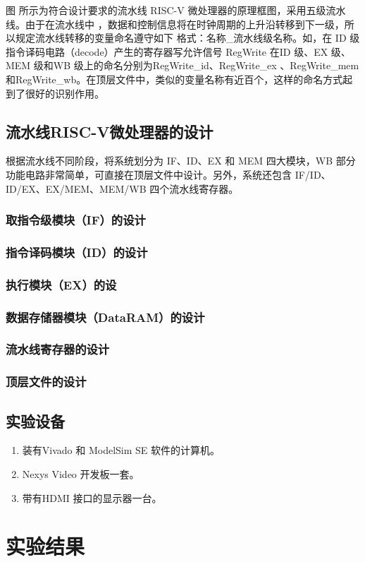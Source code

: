 \documentclass{../source/Experiment}
\begin{document}
        图  所示为符合设计要求的流水线 RISC-V 微处理器的原理框图，采用五级流水线。由于在流水线中 ，数据和控制信息将在时钟周期的上升沿转移到下一级，所以规定流水线转移的变量命名遵守如下 格式：名称\_流水线级名称。如，在 ID 级指令译码电路（decode）产生的寄存器写允许信号 RegWrite 在ID 级、EX 级、MEM 级和WB 级上的命名分别为RegWrite\_id、RegWrite\_ex 、RegWrite\_mem 和RegWrite\_wb。在顶层文件中，类似的变量名称有近百个，这样的命名方式起到了很好的识别作用。

        \subsection{流水线RISC-V微处理器的设计}
        根据流水线不同阶段，将系统划分为 IF、ID、EX 和 MEM 四大模块，WB 部分功能电路非常简单，可直接在顶层文件中设计。另外，系统还包含 IF/ID、ID/EX、EX/MEM、MEM/WB 四个流水线寄存器。
        \subsubsection{取指令级模块（IF）的设计}

        \subsubsection{指令译码模块（ID）的设计}

        \subsubsection{执行模块（EX）的设}

        \subsubsection{数据存储器模块（DataRAM）的设计}

        \subsubsection{流水线寄存器的设计}

        \subsubsection{顶层文件的设计}

    \subsection{实验设备}
        \begin{enumerate}
            \item  装有Vivado 和 ModelSim SE 软件的计算机。
            \item  Nexys Video 开发板一套。
            \item  带有HDMI 接口的显示器一台。
        \end{enumerate}

    \section{实验结果}
        
\end{document}
